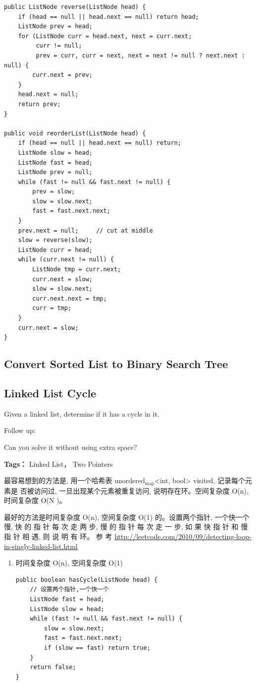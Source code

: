 \documentclass[12pt]{book}
\begin{document}
\lstset{language=java,label= ,caption= ,numbers=none}
\begin{lstlisting}
public ListNode reverse(ListNode head) {
    if (head == null || head.next == null) return head;
    ListNode prev = head;
    for (ListNode curr = head.next, next = curr.next;
         curr != null;
         prev = curr, curr = next, next = next != null ? next.next : null) {
        curr.next = prev;
    }
    head.next = null;
    return prev;
}

public void reorderList(ListNode head) {
    if (head == null || head.next == null) return;
    ListNode slow = head;
    ListNode fast = head;
    ListNode prev = null;
    while (fast != null && fast.next != null) {
        prev = slow;
        slow = slow.next;
        fast = fast.next.next;
    }
    prev.next = null;     // cut at middle
    slow = reverse(slow);
    ListNode curr = head;
    while (curr.next != null) {
        ListNode tmp = curr.next;
        curr.next = slow;
        slow = slow.next;
        curr.next.next = tmp;
        curr = tmp;
    }
    curr.next = slow;
}
\end{lstlisting}

\subsection{Convert Sorted List to Binary Search Tree}
\label{sec-3-2-9}
\subsection{Linked List Cycle}
\label{sec-3-2-10}
Given a linked list, determine if it has a cycle in it.

Follow up:

Can you solve it without using extra space?

\textbf{Tags：} Linked List， Two Pointers

最容易想到的方法是, 用一个哈希表 unordered$_{\text{map}}$<int,  bool> visited, 记录每个元素是
否被访问过, 一旦出现某个元素被重复访问, 说明存在环。空间复杂度 O(n), 时间复杂度 O(N )。

最好的方法是时间复杂度 O(n), 空间复杂度 O(1) 的。设置两个指针, 一个快一个慢, 快
的 指 针 每 次 走 两 步,  慢 的 指 针 每 次 走 一 步,  如 果 快 指 针 和 慢 指 针 相 遇,  则 说 明 有 环。 参 考
\url{http://leetcode.com/2010/09/detecting-loop-in-singly-linked-list.html}

\begin{enumerate}
\item 时间复杂度 O(n), 空间复杂度 O(1)
\label{sec-3-2-10-1}

\lstset{language=java,label= ,caption= ,numbers=none}
\begin{lstlisting}
public boolean hasCycle(ListNode head) {
    // 设置两个指针,一个快一个
    ListNode fast = head;
    ListNode slow = head;
    while (fast != null && fast.next != null) {
        slow = slow.next;
        fast = fast.next.next;
        if (slow == fast) return true;
    }
    return false;
}
\end{lstlisting}
\end{enumerate}
\end{document}
